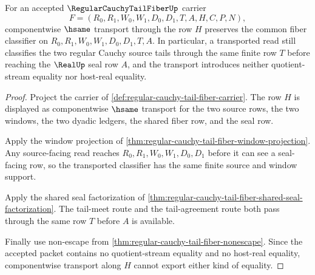 \begin{theorem}
\label{thm:regular-cauchy-tail-fiber-classifier-stability}
For an accepted $\RegularCauchyTailFiberUp$ carrier
$$
F=(R_0,R_1,W_0,W_1,D_0,D_1,T,A,H,C,P,N),
$$
componentwise $\hsame$ transport through the row $H$ preserves the common fiber classifier on $R_0,R_1,W_0,W_1,D_0,D_1,T,A$. In particular, a transported read still classifies the two regular Cauchy source tails through the same finite row $T$ before reaching the $\RealUp$ seal row $A$, and the transport introduces neither quotient-stream equality nor host-real equality.
\end{theorem}
\begin{proof}
Project the carrier of \autoref{def:regular-cauchy-tail-fiber-carrier}. The row $H$ is displayed as componentwise $\hsame$ transport for the two source rows, the two windows, the two dyadic ledgers, the shared fiber row, and the seal row.

Apply the window projection of \autoref{thm:regular-cauchy-tail-fiber-window-projection}. Any source-facing read reaches $R_0,R_1,W_0,W_1,D_0,D_1$ before it can see a seal-facing row, so the transported classifier has the same finite source and window support.

Apply the shared seal factorization of \autoref{thm:regular-cauchy-tail-fiber-shared-seal-factorization}. The tail-meet route and the tail-agreement route both pass through the same row $T$ before $A$ is available.

Finally use non-escape from \autoref{thm:regular-cauchy-tail-fiber-nonescape}. Since the accepted packet contains no quotient-stream equality and no host-real equality, componentwise transport along $H$ cannot export either kind of equality.
\end{proof}

